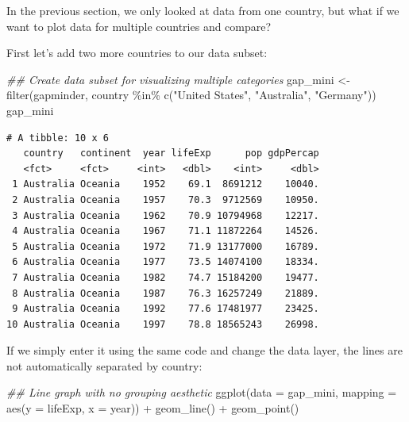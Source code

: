 \documentclass[
  letterpaper,
  DIV=11,
  numbers=noendperiod]{scrreprt}
\newenvironment{Shaded}{\begin{snugshade}}{\end{snugshade}}
\newcommand{\AttributeTok}[1]{\textcolor[rgb]{0.40,0.45,0.13}{#1}}
\newcommand{\DocumentationTok}[1]{\textcolor[rgb]{0.37,0.37,0.37}{\textit{#1}}}
\newcommand{\FunctionTok}[1]{\textcolor[rgb]{0.28,0.35,0.67}{#1}}
\newcommand{\NormalTok}[1]{\textcolor[rgb]{0.00,0.23,0.31}{#1}}
\newcommand{\OtherTok}[1]{\textcolor[rgb]{0.00,0.23,0.31}{#1}}
\newcommand{\SpecialCharTok}[1]{\textcolor[rgb]{0.37,0.37,0.37}{#1}}
\newcommand{\StringTok}[1]{\textcolor[rgb]{0.13,0.47,0.30}{#1}}
\begin{document}
In the previous section, we only looked at data from one country, but
what if we want to plot data for multiple countries and compare?

First let's add two more countries to our data subset:

\begin{Shaded}
\begin{Highlighting}[]
\DocumentationTok{\#\# Create data subset for visualizing multiple categories}
\NormalTok{gap\_mini }\OtherTok{\textless{}{-}} \FunctionTok{filter}\NormalTok{(gapminder,}
\NormalTok{                   country }\SpecialCharTok{\%in\%} \FunctionTok{c}\NormalTok{(}\StringTok{"United States"}\NormalTok{,}
                                  \StringTok{"Australia"}\NormalTok{,}
                                  \StringTok{"Germany"}\NormalTok{))}
\NormalTok{gap\_mini}
\end{Highlighting}
\end{Shaded}

\begin{verbatim}
# A tibble: 10 x 6
   country   continent  year lifeExp      pop gdpPercap
   <fct>     <fct>     <int>   <dbl>    <int>     <dbl>
 1 Australia Oceania    1952    69.1  8691212    10040.
 2 Australia Oceania    1957    70.3  9712569    10950.
 3 Australia Oceania    1962    70.9 10794968    12217.
 4 Australia Oceania    1967    71.1 11872264    14526.
 5 Australia Oceania    1972    71.9 13177000    16789.
 6 Australia Oceania    1977    73.5 14074100    18334.
 7 Australia Oceania    1982    74.7 15184200    19477.
 8 Australia Oceania    1987    76.3 16257249    21889.
 9 Australia Oceania    1992    77.6 17481977    23425.
10 Australia Oceania    1997    78.8 18565243    26998.
\end{verbatim}

If we simply enter it using the same code and change the data layer, the
lines are not automatically separated by country:

\begin{Shaded}
\begin{Highlighting}[]
\DocumentationTok{\#\# Line graph with no grouping aesthetic}
\FunctionTok{ggplot}\NormalTok{(}\AttributeTok{data =}\NormalTok{ gap\_mini, }
       \AttributeTok{mapping =} \FunctionTok{aes}\NormalTok{(}\AttributeTok{y =}\NormalTok{ lifeExp, }
                     \AttributeTok{x =}\NormalTok{ year)) }\SpecialCharTok{+}
  \FunctionTok{geom\_line}\NormalTok{() }\SpecialCharTok{+}
  \FunctionTok{geom\_point}\NormalTok{()}
\end{Highlighting}
\end{Shaded}
\end{document}
